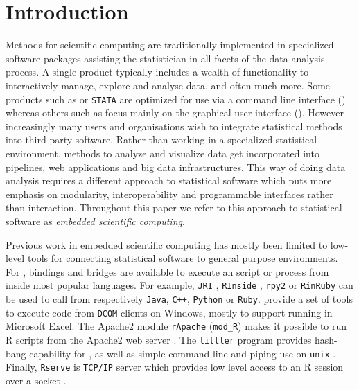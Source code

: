 \section{Introduction}

Methods for scientific computing are traditionally implemented in specialized software packages assisting the statistician in all facets of the data analysis process. A single product typically includes a wealth of functionality to interactively manage, explore and analyse data, and often much more. Some products such as \R or \texttt{STATA} are optimized for use via a command line interface (\CLI) whereas others such as \SPSS focus mainly on the graphical user interface (\GUI). However increasingly many users and organisations wish to integrate statistical methods into third party software. Rather than working in a specialized statistical environment, methods to analyze and visualize data get incorporated into pipelines, web applications and big data infrastructures. This way of doing data analysis requires a different approach to statistical software which puts more emphasis on modularity, interoperability and programmable interfaces rather than \UI interaction. Throughout this paper we refer to this approach to statistical software as \emph{embedded scientific computing}.

Previous work in embedded scientific computing has mostly been limited to low-level tools for connecting statistical software to general purpose environments. For \R, bindings and bridges are available to execute an \R script or process from inside most popular languages. For example, \texttt{JRI} \citep{rjava}, \texttt{RInside} \citep{eddelbuettel2011rcpp}, \texttt{rpy2} \citep{gautier2008rpy2} or \texttt{RinRuby} \citep{dahl2008rinruby} can be used to call \R from respectively \texttt{Java}, \texttt{C++}, \texttt{Python} or \texttt{Ruby}. \cite{heiberger2009r} provide a set of tools to execute \R code from \texttt{DCOM} clients on Windows, mostly to support running \R in Microsoft Excel. The Apache2 module \texttt{rApache} (\texttt{mod\_R}) makes it possible to run R scripts from the Apache2 web server \citep{horner2013rapache}. The \texttt{littler} program provides hash-bang capability for \R, as well as simple command-line and piping use on \texttt{unix} \citep{littler}. Finally, \texttt{Rserve} is \texttt{TCP/IP} server which provides low level access to an R session over a socket \citep{urbanek2013rserve}. 

